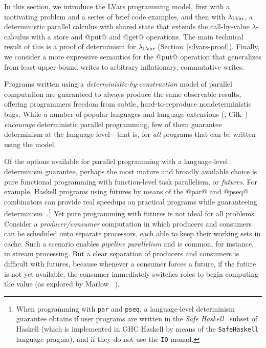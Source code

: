 \ifdefined\JOURNAL

In this section, we introduce the LVars programming model, first with
a motivating problem and a series of brief code examples, and then
with $\lambda_{\textrm{LVar}}$, a deterministic parallel calculus with shared
state that extends the call-by-value $\lambda$-calculus with a store
and @put@ and @get@ operations.  The main technical result of
this  is a proof of determinism for
$\lambda_{\textrm{LVar}}$ (Section~\ref{s:lvars-proof}).  Finally, we consider a
more expressive semantics for the @put@ operation that generalizes
from least-upper-bound writes to arbitrary inflationary, commutative
writes.

\fi

\ifdefined\DISSERTATION

Programs written using a \emph{deterministic-by-construction} model of
parallel computation are guaranteed to always produce the same
observable results, offering programmers freedom from subtle,
hard-to-reproduce nondeterministic bugs.  While a number of popular
languages and language extensions (\eg,
Cilk~\cite{cilk}) \emph{encourage} deterministic parallel programming,
few of them guarantee determinism at the language level---that is, for
\emph{all} programs that can be written using the model.

Of the options available for parallel programming with a
language-level determinism guarantee, perhaps the most mature and
broadly available choice is pure functional programming with
function-level task parallelism, or \emph{futures}.  For example,
Haskell programs using futures by means of the @par@ and @pseq@
combinators can provide real speedups on practical programs while
guaranteeing determinism~\cite{marlow-par}.\footnote{When programming
  with \lstinline|par| and \lstinline|pseq|, a language-level
  determinism guarantee obtains if user programs are written in the
  \emph{Safe Haskell}~\cite{safe-haskell} subset of Haskell (which is
  implemented in GHC Haskell by means of the \lstinline|SafeHaskell|
  language pragma), and if they do not use the \lstinline|IO| monad.}
Yet pure programming with futures is not ideal for all problems.
Consider a \emph{producer/consumer} computation in which producers and
consumers can be scheduled onto separate processors, each able to keep
their working sets in cache.  Such a scenario enables \emph{pipeline
  parallelism} and is common, for instance, in stream processing.  But
a clear separation of producers and consumers is difficult with
futures, because whenever a consumer forces a future, if the future is
not yet available, the consumer immediately switches roles to begin
computing the value (as explored by Marlow \etal~\cite{monad-par}).

